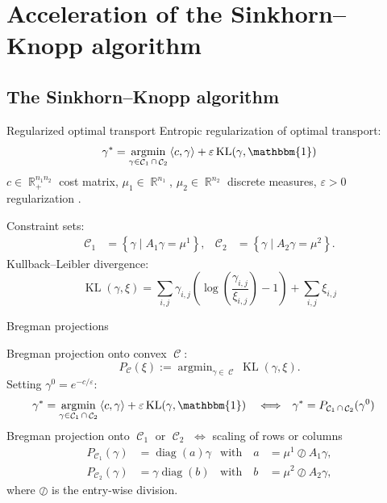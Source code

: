 \documentclass[compress]{beamer}
\newcommand{\scal}[2]{\left\langle #1 , #2 \right\rangle}
\DeclareMathOperator{\IR}{\mathbb{R}}
\DeclareMathOperator*{\argmin}{argmin}
\DeclareMathOperator{\One}{\mathbbm{1}}
\DeclareMathOperator{\Ccal}{\mathcal{C}}
\DeclareMathOperator{\diag}{diag}
\DeclareMathOperator{\KL}{KL}
\renewcommand{\epsilon}{\varepsilon}
\begin{document}
\section[Overrelaxing SK]{Acceleration of  the Sinkhorn--Knopp algorithm }

\subsection[SK algorithm]{The Sinkhorn--Knopp algorithm}
\begin{frame}{Regularized optimal transport}
Entropic regularization of optimal transport:
\begin{equation*} \label{eq:problem}
\gamma^* = \argmin_{\gamma \in \Ccal_1 \cap \Ccal_2}
	\scal{c}{\gamma} + \epsilon \KL(\gamma,\One)
\end{equation*}
$c \in \IR_+^{n_1 n_2}$ cost matrix, $\mu_1 \in \IR^{n_1}$, $\mu_2 \in \IR^{n_2}$ discrete measures, $\epsilon > 0$ regularization .

\pause
Constraint sets:
\begin{align*}
\Ccal_1 &= \left\{ \gamma \mid A_1 \gamma = \mu^1 \right\},
&
\Ccal_2 &= \left\{ \gamma \mid A_2 \gamma = \mu^2 \right\}.
\end{align*}
\pause
Kullback--Leibler divergence:
\begin{equation*}\label{KL}
\KL(\gamma,\xi) = \sum_{i,j} \gamma_{i,j} \left( \log \left( \frac{\gamma_{i,j}}{\xi_{i,j}} \right) -1  \right) + \sum_{i,j} \xi_{i,j}
\end{equation*}
\end{frame}


\begin{frame}{Bregman projections}
	
Bregman projection onto convex $\Ccal$:
\[
P_{\Ccal}(\xi) := \argmin_{\gamma \in \Ccal} \KL(\gamma,\xi).
\]
\pause
Setting $\gamma^0 = e^{-c/\epsilon}$:
\begin{align*}
\gamma^* &= \argmin_{\gamma \in \Ccal_1 \cap \Ccal_2}
	\scal{c}{\gamma} + \epsilon \KL(\gamma,\One)
& &\Longleftrightarrow &
\gamma^* &= P_{\Ccal_1 \cap \Ccal_2}(\gamma^0)
\end{align*}
\pause
Bregman projection onto $\Ccal_1$ or $\Ccal_2$ $\Longleftrightarrow$ scaling of rows or columns
\begin{align*}\label{scaling}
P_{\Ccal_1}(\gamma) &= \diag(a) \gamma &\text{with}\quad
a &=  {\mu^1}\oslash{A_1 \gamma}, \\
P_{\Ccal_2}(\gamma) &= \gamma \diag(b) &\text{with}\quad
b &= {\mu^2}\oslash{A_2 \gamma},\nonumber
\end{align*}
where $\oslash$ is the entry-wise division.
\end{frame}
\end{document}
